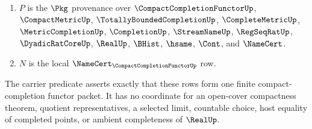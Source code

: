 \begin{definition}
\begin{enumerate}
\item $P$ is the $\Pkg$ provenance over $\CompactCompletionFunctorUp$, $\CompactMetricUp$, $\TotallyBoundedCompletionUp$, $\CompleteMetricUp$, $\MetricCompletionUp$, $\CompletionUp$, $\StreamNameUp$, $\RegSeqRatUp$, $\DyadicRatCoreUp$, $\RealUp$, $\BHist$, $\hsame$, $\Cont$, and $\NameCert$.
\item $N$ is the local $\NameCert_{\CompactCompletionFunctorUp}$ row.
\end{enumerate}
The carrier predicate asserts exactly that these rows form one finite compact-completion functor packet. It has no coordinate for an open-cover compactness theorem, quotient representatives, a selected limit, countable choice, host equality of completed points, or ambient completeness of $\RealUp$.
\end{definition}

